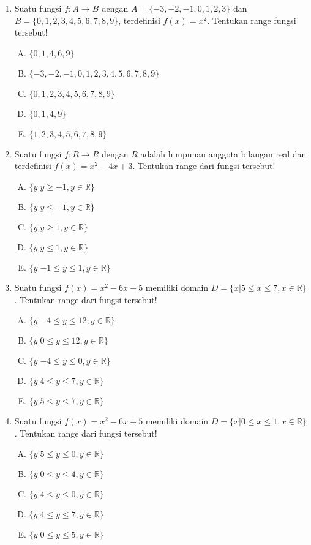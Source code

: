\documentclass[fleqn, a4paper, 12pt]{article} %
\begin{document}
\begin{enumerate}
		\item Suatu fungsi $f: A \rightarrow B$ dengan $A = \{-3, -2, -1, 0, 1, 2, 3\}$ dan $B = \{0, 1, 2, 3, 4, 5, 6, 7, 8, 9\}$, terdefinisi $f(x) = x^2$. Tentukan range fungsi tersebut!
			\begin{enumerate}[(A)]
				\item $\{0, 1, 4, 6, 9\}$
				\item $\{-3, -2, -1, 0, 1, 2, 3, 4, 5, 6, 7, 8, 9\}$
				\item $\{0, 1, 2, 3, 4, 5, 6, 7, 8, 9\}$
				\item $\{0, 1, 4, 9\}$
				\item $\{1, 2, 3, 4, 5, 6, 7, 8, 9\}$
			\end{enumerate}
		\item Suatu fungsi $f: R \rightarrow R$ dengan $R$ adalah himpunan anggota bilangan real dan terdefinisi $f(x) = x^2 - 4x + 3$. Tentukan range dari fungsi tersebut!
			\begin{enumerate}[(A)]
				\item $\{y | y \geq -1, y \in \mathbb{R}\}$
				\item $\{y | y \leq -1, y \in \mathbb{R}\}$
				\item $\{y | y \geq 1, y \in \mathbb{R}\}$
				\item $\{y | y \leq 1, y \in \mathbb{R}\}$
				\item $\{y | -1 \leq y \leq 1, y \in \mathbb{R}\}$
			\end{enumerate}
		\item Suatu fungsi $f(x) = x^2 - 6x + 5$ memiliki domain $D = \{x | 5 \leq x \leq 7, x \in \mathbb{R}\}$. Tentukan range dari fungsi tersebut!
			\begin{enumerate}[(A)]
				\item $\{y | -4 \leq y \leq 12, y \in \mathbb{R}\}$
				\item $\{y | 0 \leq y \leq 12, y \in \mathbb{R}\}$
				\item $\{y | -4 \leq y \leq 0, y \in \mathbb{R}\}$
				\item $\{y | 4 \leq y \leq 7, y \in \mathbb{R}\}$
				\item $\{y | 5 \leq y \leq 7, y \in \mathbb{R}\}$
			\end{enumerate}
		\item Suatu fungsi $f(x) = x^2 - 6x + 5$ memiliki domain $D = \{x | 0 \leq x \leq 1, x \in \mathbb{R}\}$. Tentukan range dari fungsi tersebut!
			\begin{enumerate}[(A)]
				\item $\{y | 5 \leq y \leq 0, y \in \mathbb{R}\}$
				\item $\{y | 0 \leq y \leq 4, y \in \mathbb{R}\}$
				\item $\{y | 4 \leq y \leq 0, y \in \mathbb{R}\}$
				\item $\{y | 4 \leq y \leq 7, y \in \mathbb{R}\}$
				\item $\{y | 0 \leq y \leq 5, y \in \mathbb{R}\}$
			\end{enumerate}
		

\end{enumerate}
\end{document}
